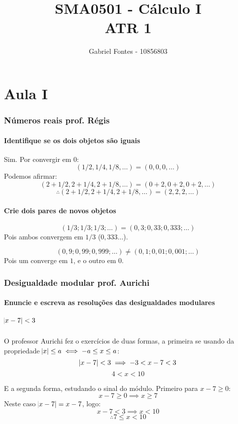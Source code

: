 \documentclass[12pt]{article}
\title{SMA0501 - Cálculo I \\ ATR 1}%
\author{Gabriel Fontes - 10856803}%
\begin{document}
\maketitle

\part*{Aula I}
\section{Números reais prof. Régis}
\subsection{Identifique se os dois objetos são iguais}
Sim. Por convergir em \(0\):
\[ (1/2,1/4,1/8,\dots) = (0,0,0,\dots) \]
Podemos afirmar:
\[ (2+1/2, 2+1/4, 2+1/8, \dots) = (0+2,0+2,0+2,\dots) \]
\[ \therefore (2+1/2, 2+1/4, 2+1/8, \dots) = (2,2,2,\dots) \]

\subsection{Crie dois pares de novos objetos}
\[ (1/3;1/3;1/3;\dots) = (0,3; 0,33; 0,333; \dots) \]
Pois ambos convergem em \( 1/3 \) (\(0,333\dots\)).

\[ (0,9;0,99;0,999;\dots) \ne (0,1;0,01;0,001;\dots) \]
Pois um converge em \(1\), e o outro em \(0\).

\section{Desigualdade modular prof. Aurichi}
\subsection{Enuncie e escreva as resoluções das desigualdades modulares}
\subsubsection{\(\abs{x-7} < 3\)}
O professor Aurichi fez o exercícios de duas formas, a primeira se usando da propriedade \(\abs{x} \leq a \iff -a \leq x \leq a\):
\[\abs{x-7} < 3 \implies -3 < x - 7 < 3\]
\[
	\boxed{
		4 < x < 10
	}
\]

\bigskip
\bigskip

E a segunda forma, estudando o sinal do módulo. Primeiro para \(x-7 \geq 0 \):
\[
	x-7 \geq 0 \implies x \geq 7
\]
Neste caso \( \abs{x-7} = x-7 \), logo:
\[
	x-7 < 3 \implies x < 10
\]
\[
	\therefore 7 \leq x < 10
\]
\end{document}
